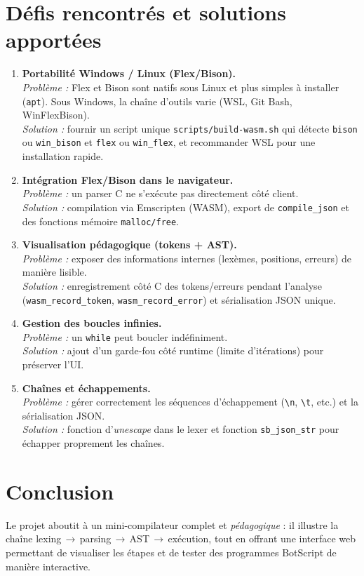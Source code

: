 \documentclass[11pt,a4paper]{article}
\begin{document}
\section{Défis rencontrés et solutions apportées}
\begin{enumerate}[label=\textbf{D\arabic*.}]
  \item \textbf{Portabilité Windows / Linux (Flex/Bison).}\\
  \emph{Problème :} Flex et Bison sont natifs sous Linux et plus simples à installer (\texttt{apt}). Sous Windows, la chaîne d'outils varie (WSL, Git Bash, WinFlexBison).\\
  \emph{Solution :} fournir un script unique \texttt{scripts/build-wasm.sh} qui détecte \texttt{bison} ou \texttt{win\_bison} et \texttt{flex} ou \texttt{win\_flex}, et recommander WSL pour une installation rapide.

  \item \textbf{Intégration Flex/Bison dans le navigateur.}\\
  \emph{Problème :} un parser C ne s'exécute pas directement côté client.\\
  \emph{Solution :} compilation via Emscripten (WASM), export de \texttt{compile\_json} et des fonctions mémoire \texttt{malloc/free}.

  \item \textbf{Visualisation pédagogique (tokens + AST).}\\
  \emph{Problème :} exposer des informations internes (lexèmes, positions, erreurs) de manière lisible.\\
  \emph{Solution :} enregistrement côté C des tokens/erreurs pendant l'analyse (\texttt{wasm\_record\_token}, \texttt{wasm\_record\_error}) et sérialisation JSON unique.

  \item \textbf{Gestion des boucles infinies.}\\
  \emph{Problème :} un \texttt{while} peut boucler indéfiniment.\\
  \emph{Solution :} ajout d'un garde-fou côté runtime (limite d'itérations) pour préserver l'UI.

  \item \textbf{Chaînes et échappements.}\\
  \emph{Problème :} gérer correctement les séquences d'échappement (\texttt{\textbackslash n}, \texttt{\textbackslash t}, etc.) et la sérialisation JSON.\\
  \emph{Solution :} fonction d'\emph{unescape} dans le lexer et fonction \texttt{sb\_json\_str} pour échapper proprement les chaînes.
\end{enumerate}

\section{Conclusion}
Le projet aboutit à un mini-compilateur complet et \emph{pédagogique} : il illustre la chaîne lexing\,$\to$\,parsing\,$\to$\,AST\,$\to$\,exécution, tout en offrant une interface web permettant de visualiser les étapes et de tester des programmes BotScript de manière interactive.
\end{document}
